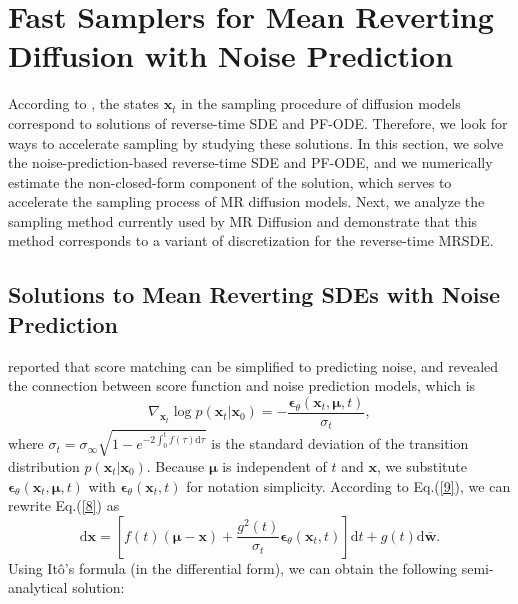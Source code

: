 \section{Fast Samplers for Mean Reverting Diffusion with Noise Prediction}
\label{section3}

According to \cite{song2020sde}, the states $\boldsymbol{x}_t$ in the sampling procedure of diffusion models correspond to solutions of reverse-time SDE and PF-ODE. Therefore, we look for ways to accelerate sampling by studying these solutions. In this section, we solve the noise-prediction-based reverse-time SDE and PF-ODE, and we numerically estimate the non-closed-form component of the solution, which serves to accelerate the sampling process of MR diffusion models. Next, we analyze the sampling method currently used by MR Diffusion and demonstrate that this method corresponds to a variant of discretization for the reverse-time MRSDE.

\subsection{Solutions to Mean Reverting SDEs with Noise Prediction}
\label{section3.1}

\cite{ho2020ddpm} reported that score matching can be simplified to predicting noise, and \cite{song2020sde} revealed the connection between score function and noise prediction models, which is
\begin{equation}
    \nabla_{\boldsymbol{x}_t}\log p(\boldsymbol{x}_t|\boldsymbol{x}_0)=-\frac{\boldsymbol{\epsilon}_\theta(\boldsymbol{x}_t,\boldsymbol{\mu},t)}{\sigma_t},
    \label{9}
\end{equation}
where $\sigma_t=\sigma_\infty\sqrt{1-e^{-2\int_0^t f(\tau)\mathrm{d}\tau}}$ is the standard deviation of the transition distribution $p(\boldsymbol{x}_t|\boldsymbol{x}_0)$. Because $\boldsymbol\mu$ is independent of $t$ and $\boldsymbol{x}$, we substitute $\boldsymbol{\epsilon}_\theta(\boldsymbol{x}_t,\boldsymbol{\mu},t)$ with $\boldsymbol{\epsilon}_\theta(\boldsymbol{x}_t,t)$ for notation simplicity. According to Eq.(\ref{9}), we can rewrite Eq.(\ref{8}) as
\begin{equation}
    \mathrm{d}\boldsymbol{x}=\left[f(t)\left(\boldsymbol{\mu}-\boldsymbol{x}\right)+\frac{g^2(t)}{\sigma_t}\boldsymbol{\epsilon}_\theta(\boldsymbol{x}_t,t)\right]\mathrm{d}t+g(t)\mathrm{d}\bar{\boldsymbol{w}}.
    \label{10}
\end{equation}
Using Itô's formula (in the differential form), we can obtain the following semi-analytical solution:

